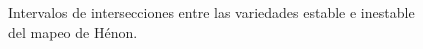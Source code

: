 \begin{figure}[htbp]
\vspace{1mm}
\caption{Intervalos de intersecciones entre las variedades estable e inestable del mapeo de Hénon.} \label{matriz_cortes}
\end{figure}



















